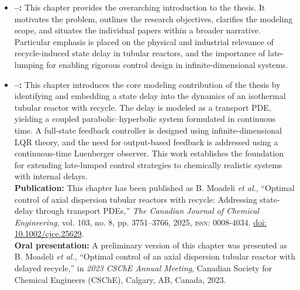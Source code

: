 \begin{itemize}
    \item \textbf{--:} This chapter provides the overarching introduction to the thesis. It motivates the problem, outlines the research objectives, clarifies the modeling scope, and situates the individual papers within a broader narrative. Particular emphasis is placed on the physical and industrial relevance of recycle-induced state delay in tubular reactors, and the importance of late-lumping for enabling rigorous control design in infinite-dimensional systems.

    \item \textbf{--:} This chapter introduces the core modeling contribution of the thesis by identifying and embedding a state delay into the dynamics of an isothermal tubular reactor with recycle. The delay is modeled as a transport PDE, yielding a coupled parabolic–hyperbolic system formulated in continuous time. A full-state feedback controller is designed using infinite-dimensional LQR theory, and the need for output-based feedback is addressed using a continuous-time Luenberger observer. This work establishes the foundation for extending late-lumped control strategies to chemically realistic systems with internal delays.\\
    \textbf{Publication:} This chapter has been published as {
        B. Moadeli \emph{et al.}, “Optimal control of axial dispersion tubular reactors with recycle: Addressing state-delay through transport PDEs,” \emph{The Canadian Journal of Chemical Engineering}, vol. 103, no. 8, pp. 3751–3766, 2025, \textsc{issn}: 0008-4034. \href{https://doi.org/10.1002/cjce.25629}{doi: 10.1002/cjce.25629}.
    }\\
    \textbf{Oral presentation:} A preliminary version of this chapter was presented as{
        B. Moadeli \emph{et al.}, “Optimal control of an axial dispersion tubular reactor with delayed recycle,” in \emph{2023 CSChE Annual Meeting}, Canadian Society for Chemical Engineers (CSChE), Calgary, AB, Canada, 2023.
    }


\end{itemize}
